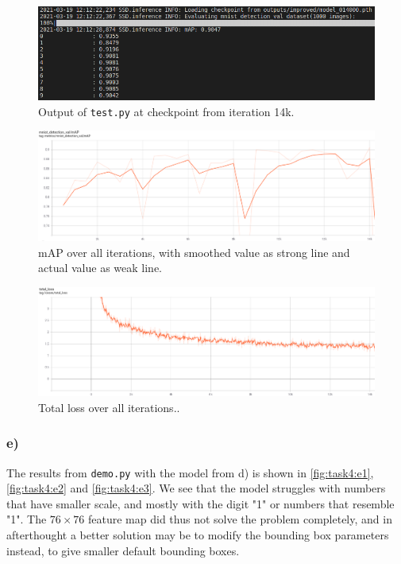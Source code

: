 \begin{figure}[h!]
  \centering
  \includegraphics[width=\textwidth]{figures/Task4c.png}
  \caption{Output of \texttt{test.py} at checkpoint from iteration 14k.}
  \label{fig:task4:d}
\end{figure}

\begin{figure}[h!]
  \centering
  \includegraphics[width=\textwidth]{figures/Task4e_mAP.png}
  \caption{mAP over all iterations, with smoothed value as strong line and actual value as weak line.}
  \label{fig:task4:d_map}
\end{figure}

\begin{figure}[h!]
  \centering
  \includegraphics[width=\textwidth]{figures/Task4d_loss.png}
  \caption{Total loss over all iterations..}
  \label{fig:task4:d_loss}
\end{figure}

\newpage
\subsubsection*{e)}

The results from \texttt{demo.py} with the model from d) is shown in \cref{fig:task4:e1}, \cref{fig:task4:e2} and \cref{fig:task4:e3}. We see that the model struggles with numbers that have smaller scale, and mostly with the digit "1" or numbers that resemble "1". The $76\times76$ feature map did thus not solve the problem completely, and in afterthought a better solution may be to modify the bounding box parameters instead, to give smaller default bounding boxes. 

